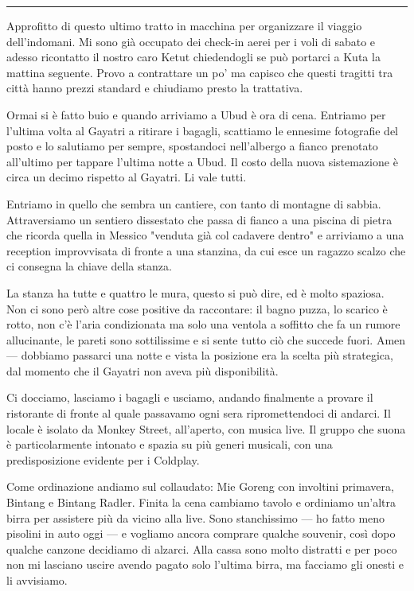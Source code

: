 \begin{center}
    \noindent\rule{0.6\textwidth}{0.4pt}
\end{center}

Approfitto di questo ultimo tratto in macchina per organizzare il viaggio dell'indomani. Mi sono già occupato dei check-in aerei per i voli di sabato e adesso ricontatto il nostro caro Ketut chiedendogli se può portarci a Kuta la mattina seguente. Provo a contrattare un po' ma capisco che questi tragitti tra città hanno prezzi standard e chiudiamo presto la trattativa.

Ormai si è fatto buio e quando arriviamo a Ubud è ora di cena. Entriamo per l'ultima volta al Gayatri a ritirare i bagagli, scattiamo le ennesime fotografie del posto e lo salutiamo per sempre, spostandoci nell'albergo a fianco prenotato all'ultimo per tappare l'ultima notte a Ubud. Il costo della nuova sistemazione è circa un decimo rispetto al Gayatri. Li vale tutti.

Entriamo in quello che sembra un cantiere, con tanto di montagne di sabbia. Attraversiamo un sentiero dissestato che passa di fianco a una piscina di pietra che ricorda quella in Messico "venduta già col cadavere dentro" e arriviamo a una reception improvvisata di fronte a una stanzina, da cui esce un ragazzo scalzo che ci consegna la chiave della stanza.

La stanza ha tutte e quattro le mura, questo si può dire, ed è molto spaziosa. Non ci sono però altre cose positive da raccontare: il bagno puzza, lo scarico è rotto, non c'è l'aria condizionata ma solo una ventola a soffitto che fa un rumore allucinante, le pareti sono sottilissime e si sente tutto ciò che succede fuori. Amen — dobbiamo passarci una notte e vista la posizione era la scelta più strategica, dal momento che il Gayatri non aveva più disponibilità.

Ci docciamo, lasciamo i bagagli e usciamo, andando finalmente a provare il ristorante di fronte al quale passavamo ogni sera ripromettendoci di andarci. Il locale è isolato da Monkey Street, all'aperto, con musica live. Il gruppo che suona è particolarmente intonato e spazia su più generi musicali, con una predisposizione evidente per i Coldplay.

Come ordinazione andiamo sul collaudato: Mie Goreng con involtini primavera, Bintang e Bintang Radler. Finita la cena cambiamo tavolo e ordiniamo un'altra birra per assistere più da vicino alla live. Sono stanchissimo — ho fatto meno pisolini in auto oggi — e vogliamo ancora comprare qualche souvenir, così dopo qualche canzone decidiamo di alzarci. Alla cassa sono molto distratti e per poco non mi lasciano uscire avendo pagato solo l'ultima birra, ma facciamo gli onesti e li avvisiamo.

